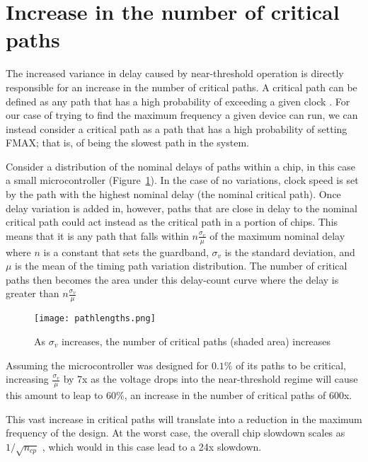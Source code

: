 \section{Increase in the number of critical paths}
\label{sec:criticalpaths}

The increased variance in delay caused by near-threshold operation is directly responsible for an increase in the number of critical paths.
A critical path can be defined as any path that has a high probability of exceeding a given clock \cite{Wang:2004bw}.
For our case of trying to find the maximum frequency a given device can run, we can instead consider a critical path as a path that has a high probability of setting FMAX; that is, of being the slowest path in the system.
  
Consider a distribution of the nominal delays of paths within a chip, in this case a small microcontroller (Figure~\ref{fig:normal}).
In the case of no variations, clock speed is set by the path with the highest nominal delay (the nominal critical path).
Once delay variation is added in, however, paths that are close in delay to the nominal critical path could act instead as the critical path in a portion of chips.
This means that it is any path that falls within $n\frac{\sigma_v}{\mu}$ of the maximum nominal delay where $n$ is a constant that sets the guardband, $\sigma_v$ is the standard deviation, and $\mu$ is the mean of the timing path variation distribution.
The number of critical paths then becomes the area under this delay-count curve where the delay is greater than $n\frac{\sigma_v}{\mu}$
 
\begin{figure}[thpb]
    \centering
    \texttt{[image: pathlengths.png]}
    \caption{As $\sigma_v$ increases, the number of critical paths (shaded area) increases}
    \label{fig:normal}
\end{figure}
 
Assuming the microcontroller was designed for $0.1\%$ of its paths to be critical, increasing $\frac{\sigma_v}{\mu}$ by 7x as the voltage drops into the near-threshold regime will cause this amount  to leap to $60\%$, an increase in the number of critical paths of 600x.

This vast increase in critical paths will translate into a reduction in the maximum frequency of the design. At the worst case, the overall chip slowdown scales as $1/\sqrt{n_{cp}}$ \cite{Bowman:2002cp}, which would in this case lead to a 24x slowdown.
